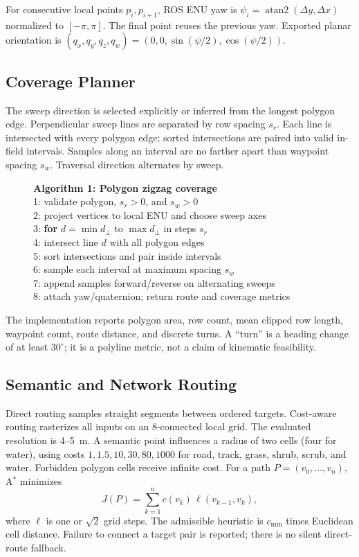 \documentclass[conference,a4paper]{IEEEtran}
\begin{document}
For consecutive local points $p_i,p_{i+1}$, ROS ENU yaw is
$\psi_i=\operatorname{atan2}(\Delta y,\Delta x)$ normalized to
$[-\pi,\pi]$. The final point reuses the previous yaw. Exported planar
orientation is $(q_x,q_y,q_z,q_w)=(0,0,\sin(\psi/2),\cos(\psi/2))$.

\subsection{Coverage Planner}
The sweep direction is selected explicitly or inferred from the longest
polygon edge. Perpendicular sweep lines are separated by row spacing $s_r$.
Each line is intersected with every polygon edge; sorted intersections are
paired into valid in-field intervals. Samples along an interval are no farther
apart than waypoint spacing $s_w$. Traversal direction alternates by sweep.

\begin{figure}[t]
\footnotesize
\begin{minipage}{0.96\columnwidth}
\textbf{Algorithm 1: Polygon zigzag coverage}\\
1: validate polygon, $s_r>0$, and $s_w>0$\\
2: project vertices to local ENU and choose sweep axes\\
3: \textbf{for} $d=\min d_\perp$ to $\max d_\perp$ in steps $s_r$\\
4: \quad intersect line $d$ with all polygon edges\\
5: \quad sort intersections and pair inside intervals\\
6: \quad sample each interval at maximum spacing $s_w$\\
7: \quad append samples forward/reverse on alternating sweeps\\
8: attach yaw/quaternion; return route and coverage metrics
\end{minipage}
\end{figure}

The implementation reports polygon area, row count, mean clipped row length,
waypoint count, route distance, and discrete turns. A ``turn'' is a heading
change of at least $30^\circ$; it is a polyline metric, not a claim of
kinematic feasibility.

\subsection{Semantic and Network Routing}
Direct routing samples straight segments between ordered targets. Cost-aware
routing rasterizes all inputs on an 8-connected local grid. The evaluated
resolution is 4--5~m. A semantic point influences a radius of two cells (four
for water), using costs $1,1.5,10,30,80,1000$ for road, track, grass, shrub,
scrub, and water. Forbidden polygon cells receive infinite cost. For a path
$P=(v_0,\ldots,v_n)$, A$^\ast$ minimizes
\begin{equation}
J(P)=\sum_{k=1}^{n} c(v_k)\,\ell(v_{k-1},v_k),
\end{equation}
where $\ell$ is one or $\sqrt{2}$ grid steps. The admissible heuristic is
$c_{\min}$ times Euclidean cell distance. Failure to connect a target pair is
reported; there is no silent direct-route fallback.
\end{document}
